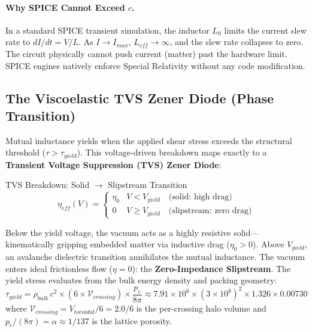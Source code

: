 \paragraph{Why SPICE Cannot Exceed $c$.}
In a standard SPICE transient simulation, the inductor $L_0$ limits the current slew rate to $dI/dt = V/L$. As $I \to I_{max}$, $L_{eff} \to \infty$, and the slew rate collapses to zero. The circuit physically cannot push current (matter) past the hardware limit. SPICE engines natively enforce Special Relativity without any code modification.

\subsection{The Viscoelastic TVS Zener Diode (Phase Transition)}

Mutual inductance yields when the applied shear stress exceeds the structural threshold ($\tau > \tau_{yield}$). This voltage-driven breakdown maps exactly to a \textbf{Transient Voltage Suppression (TVS) Zener Diode}:

\begin{resultbox}{TVS Breakdown: Solid $\to$ Slipstream Transition}
\begin{equation}
    \eta_{eff}(V) = \begin{cases}
        \eta_0 & V < V_{yield} \quad \text{(solid: high drag)} \\[4pt]
        0      & V \geq V_{yield} \quad \text{(slipstream: zero drag)}
    \end{cases}
    \label{eq:tvs_transition}
\end{equation}
\end{resultbox}

Below the yield voltage, the vacuum acts as a highly resistive solid---kinematically gripping embedded matter via inductive drag ($\eta_0 > 0$). Above $V_{yield}$, an avalanche dielectric transition annihilates the mutual inductance. The vacuum enters ideal frictionless flow ($\eta = 0$): the \textbf{Zero-Impedance Slipstream}. The yield stress evaluates from the bulk energy density and packing geometry:
\begin{equation}
    \tau_{yield} = \rho_{bulk}\, c^2 \times (6 \times \mathcal{V}_{crossing}) \times \frac{p_c}{8\pi} \approx 7.91 \times 10^{6} \times (3 \times 10^8)^2 \times 1.326 \times 0.00730
\end{equation}
where $\mathcal{V}_{crossing} = V_{toroidal}/6 = 2.0/6$ is the per-crossing halo volume and $p_c/(8\pi) = \alpha \approx 1/137$ is the lattice porosity.


